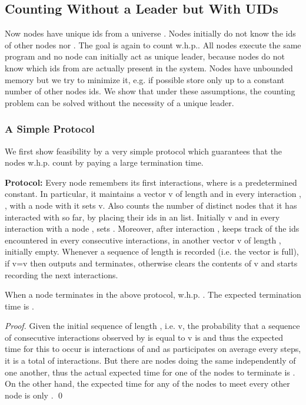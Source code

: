 \documentclass[oribibl, 11pt]{llncs}
\begin{document}
\subsection{Counting Without a Leader but With UIDs}
\label{subsec:uids}

Now nodes have unique ids from a universe . Nodes initially do not know the ids of other nodes nor . The goal is again to count  w.h.p.. All nodes execute the same program and no node can initially act as unique leader, because nodes do not know which ids from  are actually present in the system. Nodes have unbounded memory but we try to minimize it, e.g. if possible store only up to a constant number of other nodes ids. We show that under these assumptions, the counting problem can be solved without the necessity of a unique leader.

\subsubsection{A Simple Protocol}

We first show feasibility by a very simple protocol which guarantees that the nodes w.h.p. count  by paying a large termination time.

\textbf{Protocol:} Every node  remembers its first  interactions, where  is a predetermined constant. In particular, it maintains a vector v of length  and in every interaction , , with a node with  it sets v. Also  counts the number of distinct nodes that it has interacted with so far, by placing their ids in an  list. Initially v and in every interaction with a node ,  sets . Moreover, after interaction ,  keeps track of the ids encountered in every  consecutive interactions, in another vector v of length , initially empty. Whenever a sequence of length  is recorded (i.e. the vector is full), if v=v then  outputs  and terminates, otherwise  clears the contents of v and starts recording the next  interactions.

\begin{theorem}
When a node  terminates in the above protocol, w.h.p. . The expected termination time is . 
\end{theorem}
\begin{proof}
Given the initial sequence of length , i.e. v, the probability that a sequence of  consecutive interactions observed by  is equal to v is  and thus the expected time for this to occur is  interactions of  and as  participates on average every  steps, it is a total of  interactions. But there are  nodes doing the same independently of one another, thus the actual expected time for one of the nodes to terminate is . On the other hand, the expected time for any of the nodes to meet every other node is only .  
\qed
\end{proof}
\end{document}
